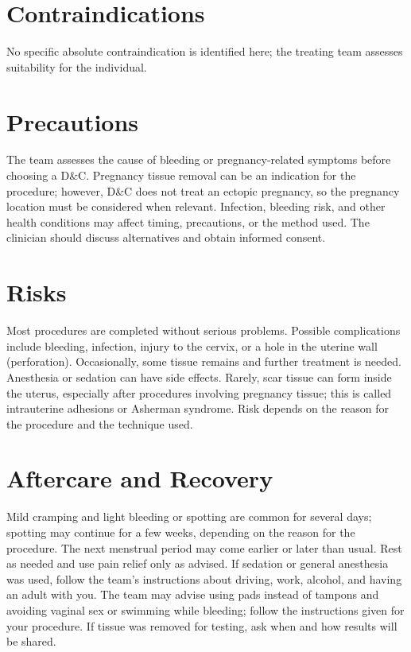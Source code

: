 \section*{Contraindications}
No specific absolute contraindication is identified here; the treating team assesses suitability for the individual.

\section*{Precautions}
The team assesses the cause of bleeding or pregnancy-related symptoms before choosing a D\&C. Pregnancy tissue removal can be an indication for the procedure; however, D\&C does not treat an ectopic pregnancy, so the pregnancy location must be considered when relevant. Infection, bleeding risk, and other health conditions may affect timing, precautions, or the method used. The clinician should discuss alternatives and obtain informed consent.

\section*{Risks}
Most procedures are completed without serious problems. Possible complications include bleeding, infection, injury to the cervix, or a hole in the uterine wall (perforation). Occasionally, some tissue remains and further treatment is needed. Anesthesia or sedation can have side effects. Rarely, scar tissue can form inside the uterus, especially after procedures involving pregnancy tissue; this is called intrauterine adhesions or Asherman syndrome. Risk depends on the reason for the procedure and the technique used.

\section*{Aftercare and Recovery}
Mild cramping and light bleeding or spotting are common for several days; spotting may continue for a few weeks, depending on the reason for the procedure. The next menstrual period may come earlier or later than usual. Rest as needed and use pain relief only as advised. If sedation or general anesthesia was used, follow the team's instructions about driving, work, alcohol, and having an adult with you. The team may advise using pads instead of tampons and avoiding vaginal sex or swimming while bleeding; follow the instructions given for your procedure. If tissue was removed for testing, ask when and how results will be shared.

